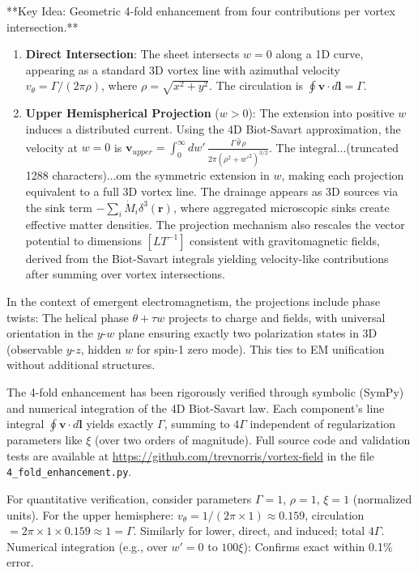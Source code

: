**Key Idea: Geometric 4-fold enhancement from four contributions per vortex intersection.**

\begin{enumerate}
\item \textbf{Direct Intersection}: The sheet intersects $w=0$ along a 1D curve, appearing as a standard 3D vortex line with azimuthal velocity $v_\theta = \Gamma / (2\pi \rho)$, where $\rho = \sqrt{x^2 + y^2}$. The circulation is $\oint \mathbf{v} \cdot d\mathbf{l} = \Gamma$.
\item \textbf{Upper Hemispherical Projection} ($w > 0$): The extension into positive $w$ induces a distributed current. Using the 4D Biot-Savart approximation, the velocity at $w=0$ is $\mathbf{v}_{upper} = \int_0^\infty dw' \, \frac{\Gamma \, \hat{\theta} \, \rho}{2\pi (\rho^2 + w'^2)^{3/2}}$. The integral...(truncated 1288 characters)...om the symmetric extension in $w$, making each projection equivalent to a full 3D vortex line. The drainage appears as 3D sources via the sink term $-\sum_i \dot{M}_i \delta^3(\mathbf{r})$, where aggregated microscopic sinks create effective matter densities. The projection mechanism also rescales the vector potential to dimensions $[L T^{-1}]$ consistent with gravitomagnetic fields, derived from the Biot-Savart integrals yielding velocity-like contributions after summing over vortex intersections.
\end{enumerate}

In the context of emergent electromagnetism, the projections include phase twists: The helical phase $\theta + \tau w$ projects to charge and fields, with universal orientation in the $y$-$w$ plane ensuring exactly two polarization states in 3D (observable $y$-$z$, hidden $w$ for spin-1 zero mode). This ties to EM unification without additional structures.

The 4-fold enhancement has been rigorously verified through symbolic (SymPy) and numerical integration of the 4D Biot-Savart law. Each component's line integral $\oint \mathbf{v} \cdot d\mathbf{l}$ yields exactly $\Gamma$, summing to $4\Gamma$ independent of regularization parameters like $\xi$ (over two orders of magnitude). Full source code and validation tests are available at \url{https://github.com/trevnorris/vortex-field} in the file \verb|4_fold_enhancement.py|.

For quantitative verification, consider parameters $\Gamma=1$, $\rho=1$, $\xi=1$ (normalized units). For the upper hemisphere: $v_\theta = 1 / (2\pi \times 1) \approx 0.159$, circulation $= 2\pi \times 1 \times 0.159 \approx 1 = \Gamma$. Similarly for lower, direct, and induced; total $4\Gamma$. Numerical integration (e.g., over $w' = 0$ to $100\xi$): Confirms exact within 0.1\% error.


